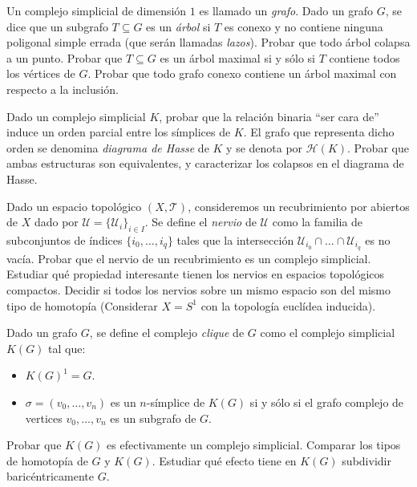 \documentclass[twoside]{article}
\begin{document}
\newpage

\begin{ejercicio}{1.7}
Un complejo simplicial de dimensión $1$ es llamado un \emph{grafo}.
Dado un grafo $G$, se dice que un subgrafo $T \subseteq G$ es un \emph{árbol} si $T$ es conexo y no contiene ninguna poligonal simple errada (que serán llamadas \emph{lazos}).
Probar que todo árbol colapsa a un punto.
Probar que $T \subseteq G$ es un árbol maximal si y sólo si $T$ contiene todos los vértices de $G$.
Probar que todo grafo conexo contiene un árbol maximal con respecto a la inclusión.
\end{ejercicio}
\begin{solucion}
\end{solucion}

\newpage

\begin{ejercicio}{1.8}
Dado un complejo simplicial $K$, probar que la relación binaria ``ser cara de'' induce un orden parcial entre los símplices de $K$.
El grafo que representa dicho orden se denomina \emph{diagrama de Hasse} de $K$ y se denota por $\mathcal{H}(K)$.
Probar que ambas estructuras son equivalentes, y caracterizar los colapsos en el diagrama de Hasse.
\end{ejercicio}
\begin{solucion}
\end{solucion}

\newpage

\begin{ejercicio}{1.9}
Dado un  espacio topológico $(X,\mathcal{T})$, consideremos un recubrimiento por abiertos de $X$ dado por $\mathcal{U} = \{\mathcal{U}_i\}_{i \in I}$.
Se define el \emph{nervio} de $\mathcal{U}$ como la familia de subconjuntos de índices $\{i_0,\dots,i_q\}$ tales que la intersección $\mathcal{U}_{i_0} \cap \dots \cap \mathcal{U}_{i_q}$ es no vacía.
Probar que el nervio de un recubrimiento es un complejo simplicial.
Estudiar qué propiedad interesante tienen los nervios en espacios topológicos compactos.
Decidir si todos los nervios sobre un mismo espacio son del mismo tipo de homotopía
(Considerar $X = S^1$ con la topología euclídea inducida).
\end{ejercicio}
\begin{solucion}
\end{solucion}

\newpage

\begin{ejercicio}{1.10}
Dado un grafo $G$, se define el complejo \emph{clique} de $G$ como el complejo simplicial $K(G)$ tal que:
\begin{itemize}
\item $K(G)^1 = G$.
\item $σ = (v_0,\dots,v_n)$ es un $n$-símplice de $K(G)$ si y sólo si el grafo complejo de vertices $v_0,\dots,v_n$ es un subgrafo de $G$.
\end{itemize}
Probar que $K(G)$ es efectivamente un complejo simplicial.
Comparar los tipos de homotopía de $G$ y $K(G)$.
Estudiar qué efecto tiene en $K(G)$ subdividir baricéntricamente $G$.
\end{ejercicio}
\begin{solucion}
\end{solucion}
\end{document}
